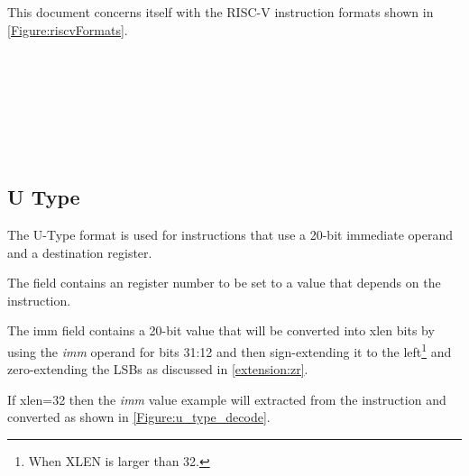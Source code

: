 This document concerns itself with the RISC-V instruction formats shown 
in \autoref{Figure:riscvFormats}.


\begin{figure}[ht]
\\
\\
\\
\\
\\
\\
\label{Figure:riscvFormats}
\end{figure}

\subsection{U Type}
\label{insnformat:utype}

The U-Type format is used for instructions that use a 20-bit immediate operand 
and a destination register.
 

The  field contains an  register number to be set to a value that
depends on the instruction.

The imm field 
contains a 20-bit value that will be converted into \Gls{xlen} bits by 
using the {\em imm} operand for bits 31:12 and then sign-extending it 
to the left\footnote{When XLEN is larger than 32.} and zero-extending 
the LSBs as discussed in \autoref{extension:zr}.

If \Gls{xlen}=32 then the {\em imm} value example will extracted from the instruction
and converted as shown in \autoref{Figure:u_type_decode}.

\begin{figure}[ht]
\centering
\DrawInsnOpUTypeDecoding
{}
\label{Figure:u_type_decode}
\label{imm.u:decode}
\end{figure}

